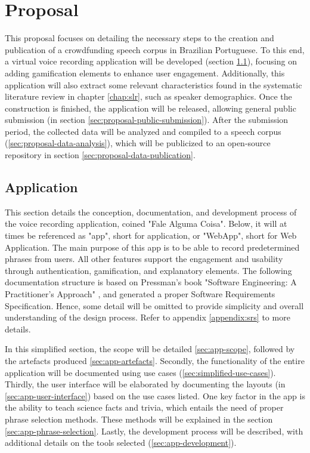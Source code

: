 \chapter[Proposal]{Proposal}
\label{chap:proposal}

This proposal focuses on detailing the necessary steps to the creation and publication of a crowdfunding speech corpus in Brazilian Portuguese. To this end, a virtual voice recording application will be developed (section \ref{sec:proposal-app}), focusing on adding gamification elements to enhance user engagement. Additionally, this application will also extract some relevant characteristics found in the systematic literature review in chapter \ref{chap:slr}, such as speaker demographics. Once the construction is finished, the application will be released, allowing general public submission (in section \ref{sec:proposal-public-submission}). After the submission period, the collected data will be analyzed and compiled to a speech corpus (\ref{sec:proposal-data-analysis}), which will be publicized to an open-source repository in section \ref{sec:proposal-data-publication}.

\section{Application}
\label{sec:proposal-app}

This section details the conception, documentation, and development process of the voice recording application, coined "Fale Alguma Coisa". Below, it will at times be referenced as "app", short for application, or "WebApp", short for Web Application. The main purpose of this app is to be able to record predetermined phrases from users. All other features support the engagement and usability through authentication, gamification, and explanatory elements. The following documentation structure is based on Pressman's book "Software Engineering: A Practitioner's Approach" \cite{pressman2014software}, and generated a proper Software Requirements Specification. Hence, some detail will be omitted to provide simplicity and overall understanding of the design process. Refer to appendix \ref{appendix:srs} to more details.

In this simplified section, the scope will be detailed \ref{sec:app-scope}, followed by the artefacts produced \ref{sec:app-artefacts}. Secondly, the functionality of the entire application will be documented using use cases (\ref{sec:simplified-use-cases}). Thirdly, the user interface will be elaborated by documenting the layouts (in \ref{sec:app-user-interface}) based on the use cases listed. One key factor in the app is the ability to teach science facts and trivia, which entails the need of proper phrase selection methods. These methods will be explained in the section \ref{sec:app-phrase-selection}. Lastly, the development process will be described, with additional details on the tools selected (\ref{sec:app-development}).

